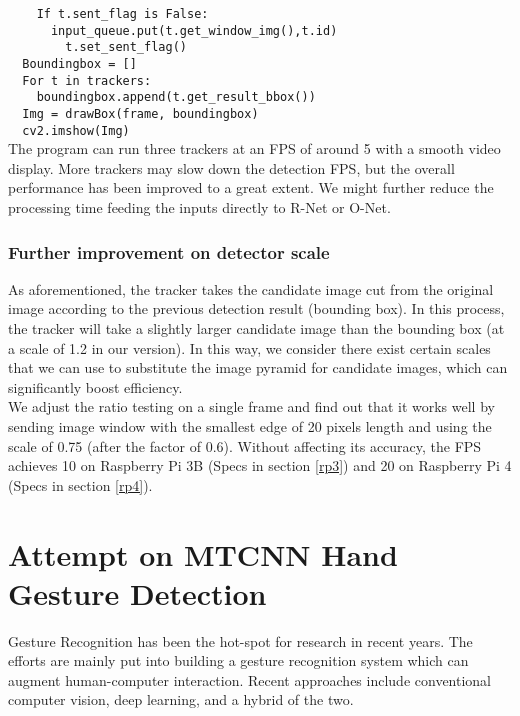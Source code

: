 \verb#    If t.sent_flag is False:#\\
\verb#      input_queue.put(t.get_window_img(),t.id)#\\
\verb#        t.set_sent_flag()#\\[.2in]
\verb#  Boundingbox = []#\\
\verb#  For t in trackers:#\\
\verb#    boundingbox.append(t.get_result_bbox())#\\
\verb#  Img = drawBox(frame, boundingbox)#\\
\verb#  cv2.imshow(Img)#\\[.2in]
The program can run three trackers at an FPS of around 5 with a smooth video display. More trackers may slow down the detection FPS, but the overall performance has been improved to a great extent. We might further reduce the processing time feeding the inputs directly to R-Net or O-Net. 
\subsubsection{Further improvement on detector scale}
As aforementioned, the tracker takes the candidate image cut from the original image according to the previous detection result (bounding box). In this process, the tracker will take a slightly larger candidate image than the bounding box (at a scale of 1.2 in our version). In this way, we consider there exist certain scales that we can use to substitute the image pyramid for candidate images, which can significantly boost efficiency. \\[.2in]
We adjust the ratio testing on a single frame and find out that it works well by sending image window with the smallest edge of 20 pixels length and using the scale of 0.75 (after the factor of 0.6). Without affecting its accuracy, the FPS achieves 10 on Raspberry Pi 3B (Specs in section \ref{rp3}) and 20 on Raspberry Pi 4 (Specs in section \ref{rp4}).

\section{Attempt on MTCNN Hand Gesture Detection}
Gesture Recognition has been the hot-spot for research in recent years. The efforts are mainly put into building a gesture recognition system which can augment human-computer interaction. Recent approaches include conventional computer vision, deep learning, and a hybrid of the two. 
